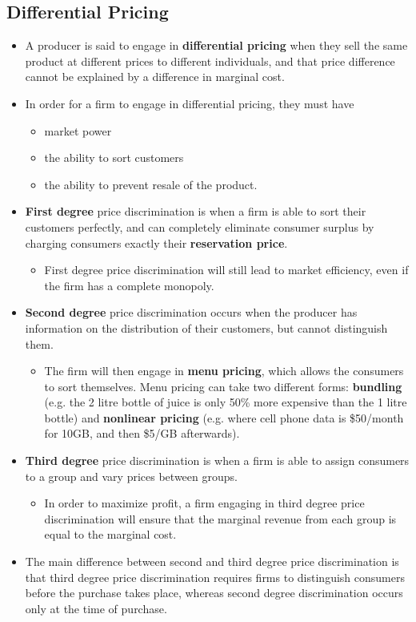 \documentclass[a4paper]{article}
\begin{document}
\subsection{Differential Pricing}
\begin{itemize}
    \item A producer is said to engage in \textbf{differential pricing} when they sell the same product at different prices to different individuals, and that price difference cannot be explained by a difference in marginal cost. 
    \item In order for a firm to engage in differential pricing, they must have
    \begin{itemize}
        \item market power
        \item the ability to sort customers
        \item the ability to prevent resale of the product.
    \end{itemize}
    \item \textbf{First degree} price discrimination is when a firm is able to sort their customers perfectly, and can completely eliminate consumer surplus by charging consumers exactly their \textbf{reservation price}.
    \begin{itemize}
        \item First degree price discrimination will still lead to market efficiency, even if the firm has a complete monopoly.
    \end{itemize}
    \item \textbf{Second degree} price discrimination occurs when the producer has information on the distribution of their customers, but cannot distinguish them. 
    \begin{itemize}
        \item The firm will then engage in \textbf{menu pricing}, which allows the consumers to sort themselves. Menu pricing can take two different forms: \textbf{bundling} (e.g. the 2 litre bottle of juice is only 50\% more expensive than the 1 litre bottle) and \textbf{nonlinear pricing} (e.g. where cell phone data is \$50/month for 10GB, and then \$5/GB afterwards). 
    \end{itemize}
    \item \textbf{Third degree} price discrimination is when a firm is able to assign consumers to a group and vary prices between groups. 
    \begin{itemize}
        \item In order to maximize profit, a firm engaging in third degree price discrimination will ensure that the marginal revenue from each group is equal to the marginal cost.
    \end{itemize}
    \item The main difference between second and third degree price discrimination is that third degree price discrimination requires firms to distinguish consumers before the purchase takes place, whereas second degree discrimination occurs only at the time of purchase.
\end{itemize}
\end{document}
